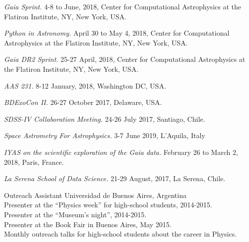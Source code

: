 \documentclass[10pt]{cv}
\newcommand\tab[1][1cm]{\hspace*{#1}}
\begin{document}
\begin{llist}
\textit{Gaia Sprint.} 4-8 to June, 2018, Center for Computational Astrophysics at the Flatiron Institute, NY, New York, USA.

\textit{Python in Astronomy.}  April 30 to May 4, 2018, Center for Computational Astrophysics at the Flatiron Institute, NY, New York, USA. 

\textit{Gaia DR2 Sprint.} 25-27 April, 2018, Center for Computational Astrophysics at the Flatiron Institute, NY, New York, USA. 

\textit{AAS 231.} 8-12 January, 2018, Washington DC, USA.

\textit{BDExoCon II.} 26-27 October 2017, Delaware, USA.

\textit{SDSS-IV Collaboration Meeting.} 24-26 July 2017, Santiago, Chile.

\textit{Space Astrometry For Astrophysics.} 3-7 June 2019, L'Aquila, Italy

\textit{IYAS on the scientific exploration of the Gaia data.} February 26 to March 2, 2018, Paris, France.

\textit{La Serena School of Data Science.} 21-29 August, 2017, La Serena, Chile.

Outreach Assistant
Universidad de Buenos Aires, Argentina\\
\tab Presenter at the ``Physics week'' for high-school students, 2014-2015.\\
\tab Presenter at the ``­Museum's night'', 2014-2015.\\
\tab Presenter at the Book Fair in Buenos Aires, May 2015.\\
\tab Monthly outreach talks for high-school students about the career in Physics.


\end{llist}
\end{document}
